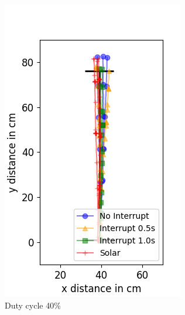 \begin{figure}
	\centering
	\begin{subfigure}[b]{0.32\textwidth}
		\includegraphics[width=\textwidth]{pics/straight_40.png}
		\caption{Duty cycle 40\%}
		\label{fig:stra_exp1}
	\end{subfigure}
	\begin{subfigure}[b]{0.32\textwidth}

\end{subfigure}
\end{figure}
